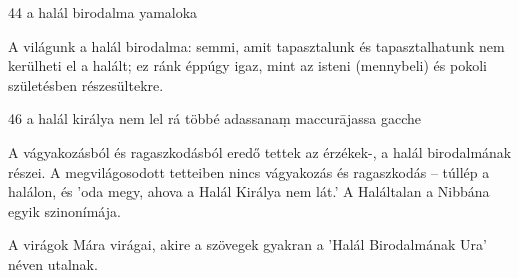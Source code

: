 
\begin{notesdescription}

\item[{44}
{a halál birodalma}
{yamaloka}] \hfill\par

A világunk a halál birodalma: semmi, amit tapasztalunk és tapasztalhatunk nem kerülheti el a halált; ez ránk éppúgy igaz, mint az isteni (mennybeli) és pokoli születésben részesültekre.

\item[{46}
{a halál királya nem lel rá többé}
{adassanaṃ maccurājassa gacche}] \hfill\par

A vágyakozásból és ragaszkodásból eredő tettek az érzékek-, a halál birodalmának részei. A megvilágosodott tetteiben nincs vágyakozás és ragaszkodás -- túllép a halálon, és 'oda megy, ahova a Halál Királya nem lát.' A Haláltalan a Nibbána egyik szinonímája.

A virágok Mára virágai, akire a szövegek gyakran a 'Halál Birodalmának Ura' néven utalnak.

\end{notesdescription}
